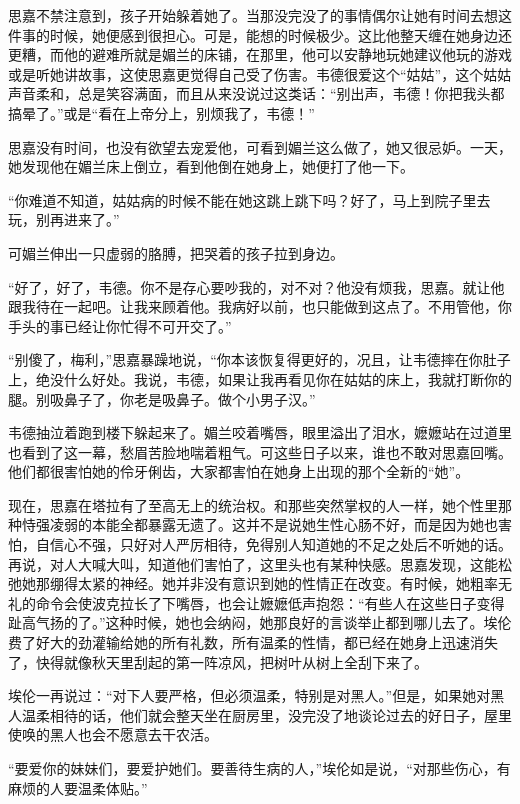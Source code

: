 \par 思嘉不禁注意到，孩子开始躲着她了。当那没完没了的事情偶尔让她有时间去想这件事的时候，她便感到很担心。可是，能想的时候极少。这比他整天缠在她身边还更糟，而他的避难所就是媚兰的床铺，在那里，他可以安静地玩她建议他玩的游戏或是听她讲故事，这使思嘉更觉得自己受了伤害。韦德很爱这个“姑姑”，这个姑姑声音柔和，总是笑容满面，而且从来没说过这类话：“别出声，韦德！你把我头都搞晕了。”或是“看在上帝分上，别烦我了，韦德！”
\par 思嘉没有时间，也没有欲望去宠爱他，可看到媚兰这么做了，她又很忌妒。一天，她发现他在媚兰床上倒立，看到他倒在她身上，她便打了他一下。
\par “你难道不知道，姑姑病的时候不能在她这跳上跳下吗？好了，马上到院子里去玩，别再进来了。”
\par 可媚兰伸出一只虚弱的胳膊，把哭着的孩子拉到身边。
\par “好了，好了，韦德。你不是存心要吵我的，对不对？他没有烦我，思嘉。就让他跟我待在一起吧。让我来顾着他。我病好以前，也只能做到这点了。不用管他，你手头的事已经让你忙得不可开交了。”
\par “别傻了，梅利，”思嘉暴躁地说，“你本该恢复得更好的，况且，让韦德摔在你肚子上，绝没什么好处。我说，韦德，如果让我再看见你在姑姑的床上，我就打断你的腿。别吸鼻子了，你老是吸鼻子。做个小男子汉。”
\par 韦德抽泣着跑到楼下躲起来了。媚兰咬着嘴唇，眼里溢出了泪水，嬷嬷站在过道里也看到了这一幕，愁眉苦脸地喘着粗气。可这些日子以来，谁也不敢对思嘉回嘴。他们都很害怕她的伶牙俐齿，大家都害怕在她身上出现的那个全新的“她”。
\par 现在，思嘉在塔拉有了至高无上的统治权。和那些突然掌权的人一样，她个性里那种恃强凌弱的本能全都暴露无遗了。这并不是说她生性心肠不好，而是因为她也害怕，自信心不强，只好对人严厉相待，免得别人知道她的不足之处后不听她的话。再说，对人大喊大叫，知道他们害怕了，这里头也有某种快感。思嘉发现，这能松弛她那绷得太紧的神经。她并非没有意识到她的性情正在改变。有时候，她粗率无礼的命令会使波克拉长了下嘴唇，也会让嬷嬷低声抱怨：“有些人在这些日子变得趾高气扬的了。”这种时候，她也会纳闷，她那良好的言谈举止都到哪儿去了。埃伦费了好大的劲灌输给她的所有礼数，所有温柔的性情，都已经在她身上迅速消失了，快得就像秋天里刮起的第一阵凉风，把树叶从树上全刮下来了。
\par 埃伦一再说过：“对下人要严格，但必须温柔，特别是对黑人。”但是，如果她对黑人温柔相待的话，他们就会整天坐在厨房里，没完没了地谈论过去的好日子，屋里使唤的黑人也会不愿意去干农活。
\par “要爱你的妹妹们，要爱护她们。要善待生病的人，”埃伦如是说，“对那些伤心，有麻烦的人要温柔体贴。”

